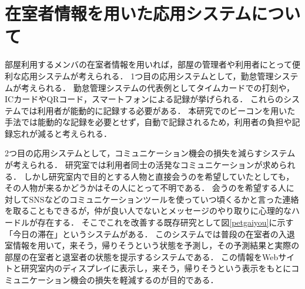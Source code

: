 
\section{在室者情報を用いた応用システムについて}\label{3.4}
部屋利用するメンバの在室者情報を用いれば，部屋の管理者や利用者にとって便利な応用システムが考えられる．
1つ目の応用システムとして，勤怠管理システムが考えられる．
勤怠管理システムの代表例としてタイムカードでの打刻や，ICカードやQRコード，スマートフォンによる記録が挙げられる．
これらのシステムでは利用者が能動的に記録する必要がある．
本研究でのビーコンを用いた手法では能動的な記録を必要とせず，自動で記録されるため，利用者の負担や記録忘れが減ると考えられる．

2つ目の応用システムとして，コミュニケーション機会の損失を減らすシステムが考えられる．
研究室では利用者同士の活発なコミュニケーションが求められる．
しかし研究室内で目的とする人物と直接会うのを希望していたとしても，その人物が来るかどうかはその人にとって不明である．
会うのを希望する人に対してSNSなどのコミュニケーションツールを使っていつ頃くるかと言った連絡を取ることもできるが，仲が良い人でないとメッセージのやり取りに心理的なハードルが存在する．
そこでこれを改善する既存研究として図\ref{petgaiyou}に示す「今日の滞在」というシステムがある．
このシステムでは普段の在室者の入退室情報を用いて，来そう，帰りそうという状態を予測し，その予測結果と実際の部屋の在室者と退室者の状態を提示するシステムである．
この情報をWebサイトと研究室内のディスプレイに表示し，来そう，帰りそうという表示をもとにコミュニケーション機会の損失を軽減するのが目的である．

